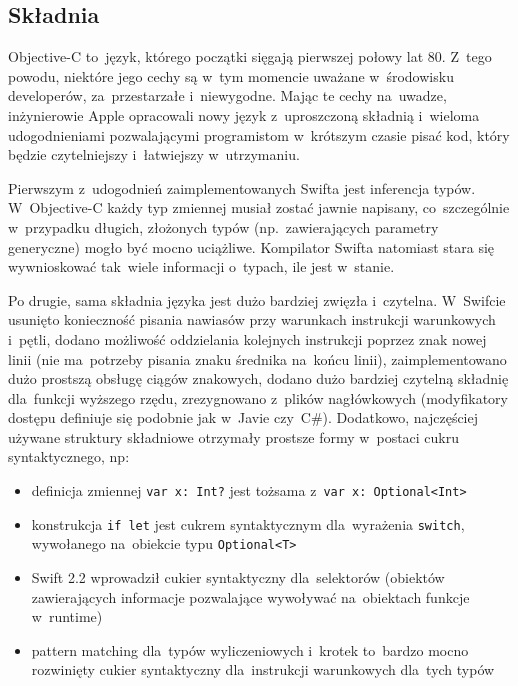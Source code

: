\documentclass[mgr, shortabstract]{iithesis}
\begin{document}
\subsection{Składnia}

Objective-C to~język, którego początki sięgają pierwszej połowy lat 80. Z~tego powodu, niektóre jego cechy są w~tym momencie uważane w~środowisku developerów, za~przestarzałe i~niewygodne. Mając te cechy na~uwadze, inżynierowie Apple opracowali nowy język z~uproszczoną składnią i~wieloma udogodnieniami pozwalającymi programistom w~krótszym czasie pisać kod, który będzie czytelniejszy i~łatwiejszy w~utrzymaniu.

Pierwszym z~udogodnień zaimplementowanych Swifta jest inferencja typów. W~Objective-C każdy typ zmiennej musiał zostać jawnie napisany, co~szczególnie w~przypadku długich, złożonych typów (np.~zawierających parametry generyczne) mogło być mocno uciążliwe. Kompilator Swifta natomiast stara się wywnioskować tak~wiele informacji o~typach, ile jest w~stanie.

Po drugie, sama składnia języka jest dużo bardziej zwięzła i~czytelna. W~Swifcie usunięto konieczność pisania nawiasów przy warunkach instrukcji warunkowych i~pętli, dodano możliwość oddzielania kolejnych instrukcji poprzez znak nowej linii (nie ma~potrzeby pisania znaku średnika na~końcu linii), zaimplementowano dużo prostszą obsługę ciągów znakowych, dodano dużo bardziej czytelną składnię dla~funkcji wyższego rzędu, zrezygnowano z~plików nagłówkowych (modyfikatory dostępu definiuje się podobnie jak w~Javie czy~C\#). Dodatkowo, najczęściej używane struktury składniowe otrzymały prostsze formy w~postaci cukru syntaktycznego, np:

\begin{itemize}
    \item definicja zmiennej \texttt{var x: Int?} jest tożsama z~\texttt{var x: Optional<Int>}
    \item konstrukcja \texttt{if let} jest cukrem syntaktycznym dla~wyrażenia \texttt{switch}, wywołanego na~obiekcie typu \texttt{Optional<T>}
    \item Swift 2.2 wprowadził cukier syntaktyczny dla~selektorów (obiektów zawierających informacje pozwalające wywoływać na~obiektach funkcje w~runtime)
    \item pattern matching dla~typów wyliczeniowych i~krotek to~bardzo mocno rozwinięty cukier syntaktyczny dla~instrukcji warunkowych dla~tych typów
\end{itemize}
\end{document}
